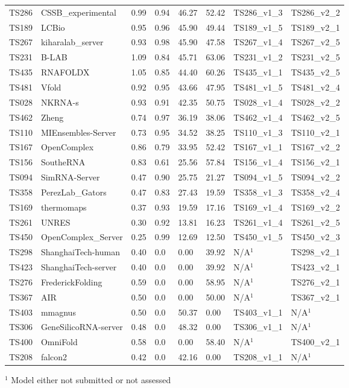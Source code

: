 \begin{table}[ht]
{\begin{tabular}{llllllll}
TS286 & CSSB\_experimental & 0.99 & 0.94 & 46.27 & 52.42 & TS286\_v1\_3 & TS286\_v2\_2 \\ 
TS189 & LCBio & 0.95 & 0.96 & 45.90 & 49.44 & TS189\_v1\_5 & TS189\_v2\_1 \\ 
TS267 & kiharalab\_server & 0.93 & 0.98 & 45.90 & 47.58 & TS267\_v1\_4 & TS267\_v2\_5 \\ 
TS231 & B-LAB & 1.09 & 0.84 & 45.71 & 63.06 & TS231\_v1\_2 & TS231\_v2\_5 \\ 
TS435 & RNAFOLDX & 1.05 & 0.85 & 44.40 & 60.26 & TS435\_v1\_1 & TS435\_v2\_5 \\ 
TS481 & Vfold & 0.92 & 0.95 & 43.66 & 47.95 & TS481\_v1\_5 & TS481\_v2\_4 \\ 
TS028 & NKRNA-s & 0.93 & 0.91 & 42.35 & 50.75 & TS028\_v1\_4 & TS028\_v2\_2 \\ 
TS462 & Zheng & 0.74 & 0.97 & 36.19 & 38.06 & TS462\_v1\_4 & TS462\_v2\_5 \\ 
TS110 & MIEnsembles-Server & 0.73 & 0.95 & 34.52 & 38.25 & TS110\_v1\_3 & TS110\_v2\_1 \\ 
TS167 & OpenComplex & 0.86 & 0.79 & 33.95 & 52.42 & TS167\_v1\_1 & TS167\_v2\_2 \\ 
TS156 & SoutheRNA & 0.83 & 0.61 & 25.56 & 57.84 & TS156\_v1\_4 & TS156\_v2\_1 \\ 
TS094 & SimRNA-Server & 0.47 & 0.90 & 25.75 & 21.27 & TS094\_v1\_5 & TS094\_v2\_2 \\ 
TS358 & PerezLab\_Gators & 0.47 & 0.83 & 27.43 & 19.59 & TS358\_v1\_3 & TS358\_v2\_4 \\ 
TS169 & thermomaps & 0.37 & 0.93 & 19.59 & 17.16 & TS169\_v1\_4 & TS169\_v2\_2 \\ 
TS261 & UNRES & 0.30 & 0.92 & 13.81 & 16.23 & TS261\_v1\_4 & TS261\_v2\_5 \\ 
TS450 & OpenComplex\_Server & 0.25 & 0.99 & 12.69 & 12.50 & TS450\_v1\_5 & TS450\_v2\_3 \\ 
TS298 & ShanghaiTech-human & 0.40 & 0.0 & 0.00 & 39.92 & N/A$^{1}$ & TS298\_v2\_1 \\ 
TS423 & ShanghaiTech-server & 0.40 & 0.0 & 0.00 & 39.92 & N/A$^{1}$ & TS423\_v2\_1 \\ 
TS276 & FrederickFolding & 0.59 & 0.0 & 0.00 & 58.95 & N/A$^{1}$ & TS276\_v2\_1 \\ 
TS367 & AIR & 0.50 & 0.0 & 0.00 & 50.00 & N/A$^{1}$ & TS367\_v2\_1 \\ 
TS403 & mmagnus & 0.50 & 0.0 & 50.37 & 0.00 & TS403\_v1\_1 & N/A$^{1}$ \\ 
TS306 & GeneSilicoRNA-server & 0.48 & 0.0 & 48.32 & 0.00 & TS306\_v1\_1 & N/A$^{1}$ \\ 
TS400 & OmniFold & 0.58 & 0.0 & 0.00 & 58.40 & N/A$^{1}$ & TS400\_v2\_1 \\ 
TS208 & falcon2 & 0.42 & 0.0 & 42.16 & 0.00 & TS208\_v1\_1 & N/A$^{1}$ \\ 
\bottomrule
\end{tabular}%
}
\begin{flushleft}\footnotesize $^{1}$ Model either not submitted or not assessed\end{flushleft}
\end{table}
